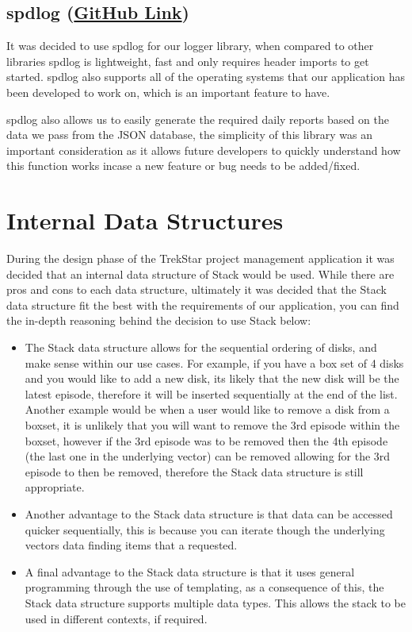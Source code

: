 \documentclass[
  english,
  a4paper,
,tablecaptionabove
]{scrartcl}
\providecommand{\tightlist}{%
  \setlength{\itemsep}{0pt}\setlength{\parskip}{0pt}}
\begin{document}
\hypertarget{spdlog-github-link}{%
\subsection{\texorpdfstring{spdlog
(\href{https://github.com/gabime/spdlog}{GitHub
Link})}{spdlog (GitHub Link)}}\label{spdlog-github-link}}

It was decided to use spdlog for our logger library, when compared to
other libraries spdlog is lightweight, fast and only requires header
imports to get started. spdlog also supports all of the operating
systems that our application has been developed to work on, which is an
important feature to have.

spdlog also allows us to easily generate the required daily reports
based on the data we pass from the JSON database, the simplicity of this
library was an important consideration as it allows future developers to
quickly understand how this function works incase a new feature or bug
needs to be added/fixed.

\newpage

\hypertarget{internal-data-structures}{%
\section{Internal Data Structures}\label{internal-data-structures}}

During the design phase of the TrekStar project management application
it was decided that an internal data structure of Stack would be used.
While there are pros and cons to each data structure, ultimately it was
decided that the Stack data structure fit the best with the requirements
of our application, you can find the in-depth reasoning behind the
decision to use Stack below:

\begin{itemize}
\tightlist
\item
  The Stack data structure allows for the sequential ordering of disks,
  and make sense within our use cases. For example, if you have a box
  set of 4 disks and you would like to add a new disk, its likely that
  the new disk will be the latest episode, therefore it will be inserted
  sequentially at the end of the list. Another example would be when a
  user would like to remove a disk from a boxset, it is unlikely that
  you will want to remove the 3rd episode within the boxset, however if
  the 3rd episode was to be removed then the 4th episode (the last one
  in the underlying vector) can be removed allowing for the 3rd episode
  to then be removed, therefore the Stack data structure is still
  appropriate.
\item
  Another advantage to the Stack data structure is that data can be
  accessed quicker sequentially, this is because you can iterate though
  the underlying vectors data finding items that a requested.
\item
  A final advantage to the Stack data structure is that it uses general
  programming through the use of templating, as a consequence of this,
  the Stack data structure supports multiple data types. This allows the
  stack to be used in different contexts, if required.
\end{itemize}
\end{document}
